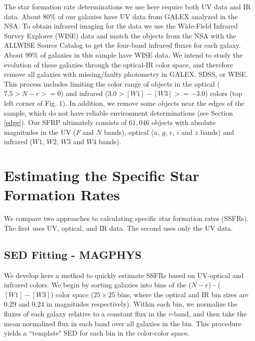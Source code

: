 The star formation rate determinations we use here require both UV data and IR data. About 80\% of our galaxies have UV data from GALEX analyzed in the NSA. To obtain infrared imaging for the data we use the Wide-Field Infrared Survey Explorer (WISE) data and match the objects from the NSA with the ALLWISE Source Catalog to get the four-band infrared fluxes for each galaxy. About 99\% of galaxies in this sample have WISE data. 
We intend to study the evolution of these galaxies through the 
optical-IR color space, and therefore remove all galaxies with 
missing/faulty photometry in GALEX, SDSS, or WISE. This process 
includes limiting the color range of objects in the optical 
($7.5> N-r >=0$) and infrared ($3.0> [W1]- [W3] >= -3.0$) 
colors (top left corner of Fig. $1$). 
In addition, we remove some objects near the edges of the sample,
which do not have reliable environment determinations (see Section 
\ref{edge}). Our SFRP ultimately consists of $61,046$ objects with 
absolute magnitudes in the UV ($F$ and $N$ bands), optical 
($u$, $g$, $r$, $i$ and $z$ bands) and infrared ($W1$, $W2$, $W3$ 
and $W4$ bands).\\

\section{Estimating the Specific Star Formation Rates}
\label{ch1_sfr}

We compare two approaches to calculating specific star 
formation rates (SSFRs). The first uses UV, optical, and 
IR data. The second uses only the UV data.

\subsection{SED Fitting - MAGPHYS}

We develop here a method to quickly estimate SSFRs based 
on UV-optical and infrared colors. We begin by sorting galaxies 
into bins of the ($N-r$) - ($[W1]-[W3]$) color space 
($25\times25$ bins, where the optical and IR bin sizes are 
0.29 and 0.24 in magnitudes respectively). Within each bin, 
we normalize the fluxes of each galaxy relative to a constant 
flux in the $r$-band, and then take the mean normalized flux 
in each band over all galaxies in the bin. This procedure 
yields a ``template" SED for each bin in the color-color space.\\

